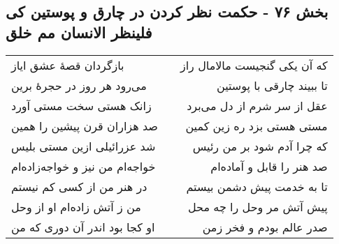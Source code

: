 \begin{center}
\section*{بخش ۷۶ - حکمت نظر کردن در چارق و پوستین کی فلینظر الانسان مم خلق}
\label{sec:sh076}
\begin{longtable}{l p{0.5cm} r}
بازگردان قصهٔ عشق ایاز
&&
که آن یکی گنجیست مالامال راز
\\
می‌رود هر روز در حجرهٔ برین
&&
تا ببیند چارقی با پوستین
\\
زانک هستی سخت مستی آورد
&&
عقل از سر شرم از دل می‌برد
\\
صد هزاران قرن پیشین را همین
&&
مستی هستی بزد ره زین کمین
\\
شد عزرائیلی ازین مستی بلیس
&&
که چرا آدم شود بر من رئیس
\\
خواجه‌ام من نیز و خواجه‌زاده‌ام
&&
صد هنر را قابل و آماده‌ام
\\
در هنر من از کسی کم نیستم
&&
تا به خدمت پیش دشمن بیستم
\\
من ز آتش زاده‌ام او از وحل
&&
پیش آتش مر وحل را چه محل
\\
او کجا بود اندر آن دوری که من
&&
صدر عالم بودم و فخر زمن
\\
\end{longtable}
\end{center}
